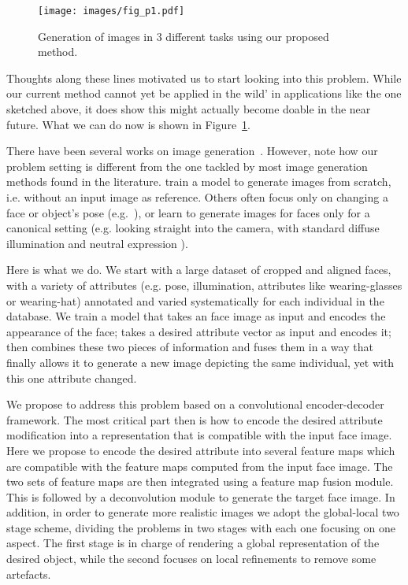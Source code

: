 \documentclass[10pt,twocolumn,letterpaper]{article}
\begin{document}
\begin{figure}[t]
\centering
\texttt{[image: images/fig\_p1.pdf]}
\caption{Generation of images in 3 different tasks using our proposed method.}
\label{fig:page1}
\end{figure}

Thoughts along these lines motivated us to start looking into this problem.
While our current method cannot yet be applied in the wild’ in applications like the one sketched above, it does show this might actually become doable in the near future.
What we can do now is shown in Figure~\ref{fig:page1}.

There have been several works on image generation~\cite{Dosovitskiy-cvpr15, Denton-nips15, Gauthier-14, Goodfellow-nips14, Hinton-icann11, Kingma-iclr14, Kulkarni-nips15, Li-icml15, Rezende-icml14, Tieleman-Thesis, Yang-nips15, Yim-cvpr15, zhu2013deep, zhu-nips14}.
However, note how our problem setting is different from the one tackled by most image generation methods found in the literature.
\cite{Denton-nips15, Gauthier-14, Goodfellow-nips14, Li-icml15} train a model to generate images from scratch, i.e. without an input image as reference.
Others often focus only on changing a face or object’s pose (e.g.~\cite{Dosovitskiy-cvpr15,Yang-nips15}), or learn to generate images for faces only for a canonical setting (e.g. looking straight into the camera, with standard diffuse illumination and neutral expression \cite{Yim-cvpr15,zhu2013deep}).

Here is what we do.
We start with a large dataset of cropped and aligned faces, with a variety of attributes (e.g. pose, illumination, attributes like wearing-glasses or wearing-hat) annotated and varied systematically for each individual in the database.
We train a model that takes an face image as input and encodes the appearance of the face; takes a desired attribute vector as input and encodes it; then combines these two pieces of information and fuses them in a way that finally allows it to generate a new image depicting the same individual, yet with this one attribute changed.

We propose to address this problem based on a convolutional encoder-decoder framework.
The most critical part then is how to encode the desired attribute modification into a representation that is compatible with the input face image.
Here we propose to encode the desired attribute into several feature maps which are compatible with the feature maps computed from the input face image.
The two sets of feature maps are then integrated using a feature map fusion module.
This is followed by a deconvolution module to generate the target face image.
In addition, in order to generate more realistic images we adopt the global-local two stage scheme, dividing the problems in two stages with each one focusing on one aspect. The first stage is in charge of rendering a global representation of the desired object, while the second focuses on local refinements to remove some artefacts.
\end{document}
